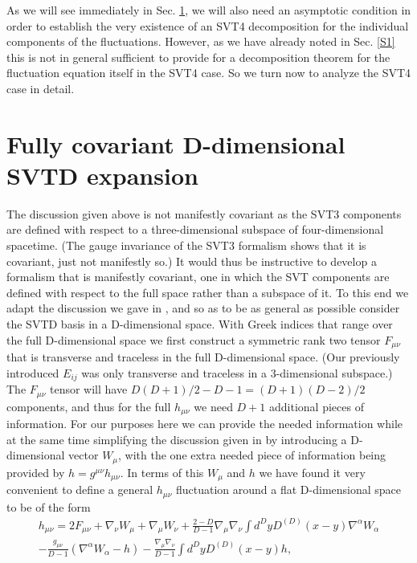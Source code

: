 \documentclass[aps,onecolumn,10pt]{revtex4}
\numberwithin{equation}{section}
\numberwithin{equation}{section}
\begin{document}
As we will see immediately in Sec. \ref{S3}, we will also need an asymptotic condition in order to establish the very existence of an SVT4 decomposition for the individual components of the fluctuations. However, as we have already noted in Sec. \ref{S1} this is not in general sufficient to provide for a decomposition theorem for the fluctuation equation itself in the SVT4 case. So we turn now to analyze the SVT4 case in detail. 

\section{Fully covariant D-dimensional SVTD expansion}
\label{S3}

The discussion given above is not manifestly covariant as the SVT3 components are defined with respect to a three-dimensional subspace of four-dimensional spacetime. (The gauge invariance of the SVT3 formalism shows that it is covariant, just not manifestly so.) It would thus be instructive to develop a formalism that is manifestly covariant, one in which the SVT components are defined with respect to the full space rather than a subspace of it. To this end we adapt the discussion we gave in \cite{Amarasinghe2018}, and so as to be as general as possible consider the SVTD basis in a D-dimensional space.  With Greek indices that range over the full D-dimensional space we first construct a symmetric rank two tensor $F_{\mu\nu}$  that is transverse and traceless in the full D-dimensional space. (Our previously introduced $E_{ij}$ was only transverse and traceless in a 3-dimensional subspace.) The $F_{\mu\nu}$ tensor will have $D(D+1)/2-D-1=(D+1)(D-2)/2$ components, and thus for the full $h_{\mu\nu}$ we need $D+1$ additional pieces of information. For our purposes here we can provide the needed information while at the same time simplifying the discussion given in \cite{Amarasinghe2018} by introducing a D-dimensional  vector $W_{\mu}$, with the one extra needed piece of information being provided by $h=g^{\mu\nu}h_{\mu\nu}$. In terms of this $W_{\mu}$ and $h$ we have found it very convenient to define a general $h_{\mu\nu}$ fluctuation around a flat D-dimensional space to be of the form
%
\begin{eqnarray}
h_{\mu\nu}=2F_{\mu\nu}+\nabla_{\nu}W_{\mu}+\nabla_{\mu}W_{\nu}+\frac{2-D}{D-1}\nabla_{\mu}\nabla_{\nu}\int d^DyD^{(D)}(x-y)\nabla^{\alpha}W_{\alpha}
\nonumber\\
-\frac{g_{\mu\nu}}{D-1}(\nabla^{\alpha}W_{\alpha}-h)-\frac{\nabla_{\mu}\nabla_{\nu}}{D-1}\int d^DyD^{(D)}(x-y)h,
\label{3.1}
\end{eqnarray}
\end{document}
